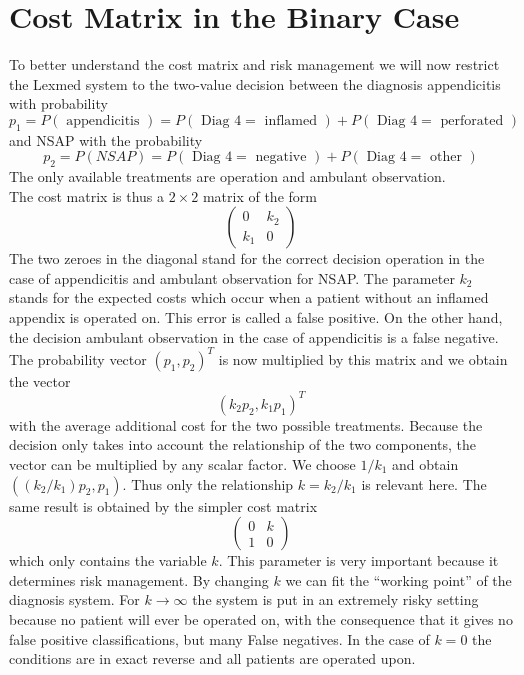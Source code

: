 \documentclass[10pt]{book}
\begin{document}
\section{Cost Matrix in the Binary Case}
To better understand the cost matrix and risk management we will now restrict the Lexmed system to the two-value decision between the diagnosis appendicitis with probability
$$
p_{1}=P(\text { appendicitis })=P(\text { Diag } 4=\text { inflamed })+P(\text { Diag } 4=\text { perforated })
$$
and NSAP with the probability
$$
p_{2}=P(N S A P)=P(\text { Diag } 4=\text { negative })+P(\text { Diag } 4=\text { other })
$$
The only available treatments are operation and ambulant observation.\\
The cost matrix is thus a $2 \times 2$ matrix of the form
$$
\left(\begin{array}{cc}
0 & k_{2} \\
k_{1} & 0
\end{array}\right)
$$
The two zeroes in the diagonal stand for the correct decision operation in the case of appendicitis and ambulant observation for NSAP. The parameter $k_{2}$ stands for the expected costs which occur when a patient without an inflamed appendix is operated on. This error is called a false positive. On the other hand, the decision ambulant observation in the case of appendicitis is a false negative. The probability vector $\left(p_{1}, p_{2}\right)^{T}$ is now multiplied by this matrix and we obtain the vector
$$
\left(k_{2} p_{2}, k_{1} p_{1}\right)^{T}
$$
with the average additional cost for the two possible treatments. Because the decision only takes into account the relationship of the two components, the vector can be multiplied by any scalar factor. We choose $1 / k_{1}$ and obtain $\left(\left(k_{2} / k_{1}\right) p_{2}, p_{1}\right)$. Thus only the relationship $k=k_{2} / k_{1}$ is relevant here. The same result is obtained by the simpler cost matrix
$$
\left(\begin{array}{ll}
0 & k \\
1 & 0
\end{array}\right)
$$
which only contains the variable $k$. This parameter is very important because it determines risk management. By changing $k$ we can fit the ``working point'' of the diagnosis system. For $k \rightarrow \infty$ the system is put in an extremely risky setting because no patient will ever be operated on, with the consequence that it gives no false positive classifications, but many False negatives. In the case of $k=0$ the conditions are in exact reverse and all patients are operated upon.
\end{document}
